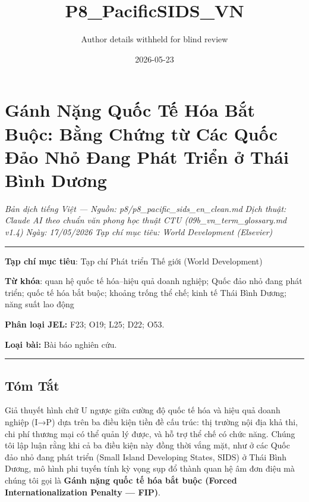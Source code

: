 \documentclass[12pt,a4paper]{article}
\title{P8\_PacificSIDS\_VN}
\author{Author details withheld for blind review}
\date{2026-05-23}
\begin{document}
\maketitle

\hypertarget{guxe1nh-nux1eb7ng-quux1ed1c-tux1ebf-huxf3a-bux1eaft-buux1ed9c-bux1eb1ng-chux1ee9ng-tux1eeb-cuxe1c-quux1ed1c-ux111ux1ea3o-nhux1ecf-ux111ang-phuxe1t-triux1ec3n-ux1edf-thuxe1i-buxecnh-dux1b0ux1a1ng}{%
\section{Gánh Nặng Quốc Tế Hóa Bắt Buộc: Bằng Chứng từ Các Quốc Đảo Nhỏ
Đang Phát Triển ở Thái Bình
Dương}\label{guxe1nh-nux1eb7ng-quux1ed1c-tux1ebf-huxf3a-bux1eaft-buux1ed9c-bux1eb1ng-chux1ee9ng-tux1eeb-cuxe1c-quux1ed1c-ux111ux1ea3o-nhux1ecf-ux111ang-phuxe1t-triux1ec3n-ux1edf-thuxe1i-buxecnh-dux1b0ux1a1ng}}

\emph{Bản dịch tiếng Việt --- Nguồn: p8/p8\_pacific\_sids\_en\_clean.md}
\emph{Dịch thuật: Claude AI theo chuẩn văn phong học thuật CTU
(09b\_vn\_term\_glossary.md v1.4)} \emph{Ngày: 17/05/2026} \emph{Tạp chí
mục tiêu: World Development (Elsevier)}

\begin{center}\rule{0.5\linewidth}{0.5pt}\end{center}

\textbf{Tạp chí mục tiêu}: Tạp chí Phát triển Thế giới (World
Development)

\textbf{Từ khóa}: quan hệ quốc tế hóa--hiệu quả doanh nghiệp; Quốc đảo
nhỏ đang phát triển; quốc tế hóa bắt buộc; khoảng trống thể chế; kinh tế
Thái Bình Dương; năng suất lao động

\textbf{Phân loại JEL:} F23; O19; L25; D22; O53.

\textbf{Loại bài:} Bài báo nghiên cứu.

\begin{center}\rule{0.5\linewidth}{0.5pt}\end{center}

\hypertarget{tuxf3m-tux1eaft}{%
\subsection{Tóm Tắt}\label{tuxf3m-tux1eaft}}

Giả thuyết hình chữ U ngược giữa cường độ quốc tế hóa và hiệu quả doanh
nghiệp (I→P) dựa trên ba điều kiện tiền đề cấu trúc: thị trường nội địa
khả thi, chi phí thương mại có thể quản lý được, và hỗ trợ thể chế có
chức năng. Chúng tôi lập luận rằng khi cả ba điều kiện này đồng thời
vắng mặt, như ở các Quốc đảo nhỏ đang phát triển (Small Island
Developing States, SIDS) ở Thái Bình Dương, mô hình phi tuyến tính kỳ
vọng sụp đổ thành quan hệ âm đơn điệu mà chúng tôi gọi là \textbf{Gánh
nặng quốc tế hóa bắt buộc (Forced Internationalization Penalty ---
FIP)}.
\end{document}

